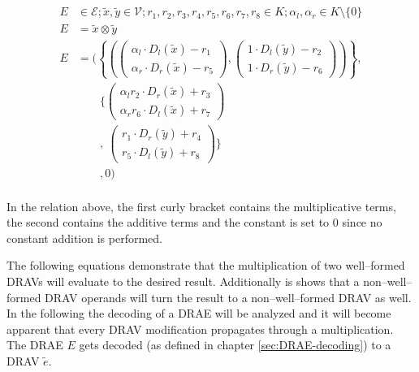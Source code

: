 


\begin{align*}
  E & \in \mathcal{E}; \widetilde{x}, \widetilde{y} \in \mathcal{V};
  r_1, r_2, r_3, r_4, r_5, r_6, r_7, r_8 \in K;
  \alpha_l, \alpha_r \in K \setminus \{0\} \\
  E & = \widetilde{x} \otimes \widetilde{y} \\
  E & = \Bigg(\left\{\left(
            \begin{pmatrix}
              \alpha_l \cdot D_l(\widetilde{x}) - r_1 \\
              \alpha_r \cdot D_r(\widetilde{x}) - r_5
            \end{pmatrix},
            \begin{pmatrix}
              1        \cdot D_l(\widetilde{y}) - r_2 \\
              1        \cdot D_r(\widetilde{y}) - r_6
            \end{pmatrix}
        \right)\right\}, \\
    &   \qquad\bigg\{
        \begin{pmatrix}
            \alpha_lr_2 \cdot D_r(\widetilde{x}) + r_3 \\
            \alpha_rr_6 \cdot D_l(\widetilde{x}) + r_7
          \end{pmatrix} \\
    &  \qquad,
        \ \begin{pmatrix}
            r_1        \cdot D_r(\widetilde{y}) + r_4 \\
            r_5        \cdot D_l(\widetilde{y}) + r_8
          \end{pmatrix}
        \bigg\} \\
    &  \qquad, 0
        \Bigg) \\
\end{align*}

In the relation above, the first curly bracket contains the multiplicative
terms, the second contains the additive terms and the constant is set to $0$
since no constant addition is performed.

The following equations demonstrate that the multiplication of two well--formed
DRAVs will evaluate to the desired result. Additionally is shows that a
non--well--formed DRAV operands will turn the result to a non--well--formed DRAV
as well. In the following the decoding of a DRAE will be analyzed and it will
become apparent that every DRAV modification propagates through a
multiplication. The DRAE $E$ gets decoded (as defined in chapter
\ref{sec:DRAE-decoding}) to a DRAV $\widetilde{e}$.

